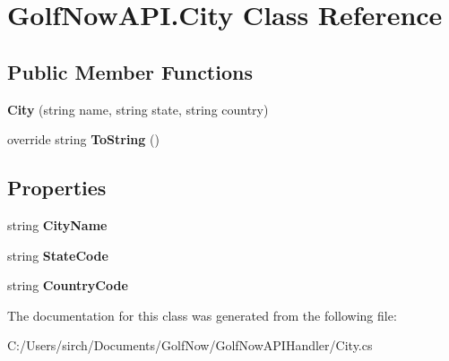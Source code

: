 \hypertarget{class_golf_now_a_p_i_1_1_city}{}\section{Golf\+Now\+A\+P\+I.\+City Class Reference}
\label{class_golf_now_a_p_i_1_1_city}
\subsection*{Public Member Functions}
\begin{DoxyCompactItemize}
\item 
\mbox{\label{class_golf_now_a_p_i_1_1_city_a6bb09becc46cd03bdcdd3973af5a466a}} 
{\bfseries City} (string name, string state, string country)
\item 
\mbox{\label{class_golf_now_a_p_i_1_1_city_a8c791bb09c1d48069be05ee287526011}} 
override string {\bfseries To\+String} ()
\end{DoxyCompactItemize}
\subsection*{Properties}
\begin{DoxyCompactItemize}
\item 
\mbox{\label{class_golf_now_a_p_i_1_1_city_a2e76f4738f5f457d16150a76b62be786}} 
string {\bfseries City\+Name}
\item 
\mbox{\label{class_golf_now_a_p_i_1_1_city_ae13e08b67b6053ec55405f8230dfe0d9}} 
string {\bfseries State\+Code}
\item 
\mbox{\label{class_golf_now_a_p_i_1_1_city_a3c63bfcc234a1b403100e3265b12c55a}} 
string {\bfseries Country\+Code}
\end{DoxyCompactItemize}


The documentation for this class was generated from the following file\+:\begin{DoxyCompactItemize}
\item 
C\+:/\+Users/sirch/\+Documents/\+Golf\+Now/\+Golf\+Now\+A\+P\+I\+Handler/City.\+cs\end{DoxyCompactItemize}
